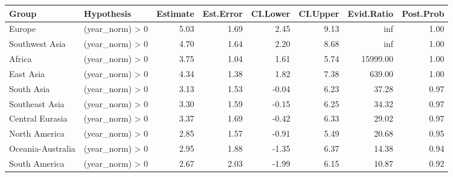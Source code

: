 \begin{tabular}{llrrrrrr}
\toprule
Group & Hypothesis & Estimate & Est.Error & CI.Lower & CI.Upper & Evid.Ratio & Post.Prob \\
\midrule
Europe & (year_norm) > 0 & 5.03 & 1.69 & 2.45 & 9.13 & inf & 1.00 \\
Southwest Asia & (year_norm) > 0 & 4.70 & 1.64 & 2.20 & 8.68 & inf & 1.00 \\
Africa & (year_norm) > 0 & 3.75 & 1.04 & 1.61 & 5.74 & 15999.00 & 1.00 \\
East Asia & (year_norm) > 0 & 4.34 & 1.38 & 1.82 & 7.38 & 639.00 & 1.00 \\
South Asia & (year_norm) > 0 & 3.13 & 1.53 & -0.04 & 6.23 & 37.28 & 0.97 \\
Southeast Asia & (year_norm) > 0 & 3.30 & 1.59 & -0.15 & 6.25 & 34.32 & 0.97 \\
Central Eurasia & (year_norm) > 0 & 3.37 & 1.69 & -0.42 & 6.33 & 29.02 & 0.97 \\
North America & (year_norm) > 0 & 2.85 & 1.57 & -0.91 & 5.49 & 20.68 & 0.95 \\
Oceania-Australia & (year_norm) > 0 & 2.95 & 1.88 & -1.35 & 6.37 & 14.38 & 0.94 \\
South America & (year_norm) > 0 & 2.67 & 2.03 & -1.99 & 6.15 & 10.87 & 0.92 \\
\bottomrule
\end{tabular}
